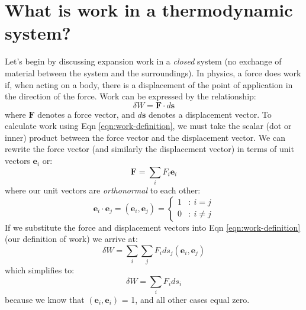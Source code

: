 \documentclass[11pt]{article}
\theoremstyle{definition}
\begin{document}
\section*{What is work in a thermodynamic system?}
Let's begin by discussing expansion work in a \textit{closed} system (no exchange of material between the system and the surroundings).
In physics, a force does work if, when acting on a body, there is a displacement of the point of application in the direction of the force.
Work can be expressed by the relationship:
\begin{equation}\label{eqn:work-definition}
\delta{W} = \mathbf{F}\cdot d\mathbf{s}
\end{equation}where $\mathbf{F}$ denotes a force vector, and $d\mathbf{s}$ denotes a displacement vector. To calculate work using Eqn \eqref{eqn:work-definition},
we must take the scalar (dot or inner) product between the force vector and the displacement vector.
We can rewrite the force vector (and similarly the displacement vector) in terms of unit vectors $\mathbf{e}_{i}$ or:
\begin{equation}
\mathbf{F} = \sum_{i}F_{i}\mathbf{e}_{i}
\end{equation}where our unit vectors are \emph{orthonormal} to each other:
\begin{equation}
\mathbf{e}_{i}\cdot\mathbf{e}_{j} = \left(\mathbf{e}_{i},\mathbf{e}_{j}\right) = \left\{
\begin{array}{lr}
1 & : ~i=j \\
0 & : ~i\neq{j}
\end{array}
\right.
\end{equation}If we substitute the force and displacement vectors into Eqn \eqref{eqn:work-definition} (our definition of work) we arrive at:
\begin{equation}
\delta W = \sum_{i}\sum_{j} F_{i}ds_{j}\left(\mathbf{e}_{i},\mathbf{e}_{j}\right)
\end{equation}which simplifies to:
\begin{equation}\label{eqn:differential-work}
\delta W = \sum_{i} F_{i}ds_{i}
\end{equation}because we know that $\left(\mathbf{e}_{i},\mathbf{e}_{i}\right)$ = 1, and all other cases equal zero.
\end{document}
